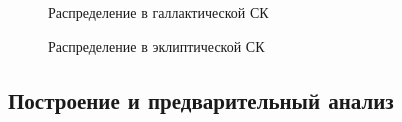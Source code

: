 \documentclass[14pt,aspectratio=43]{beamer}
\begin{document}
\begin{frame}[<alignment>]
\begin{figure}[h!]
\caption{Распределение в галлактической СК}
\label{img:hiptgasl}
\end{figure}
\end{frame}	

\begin{frame}[<alignment>]
\begin{figure}[h!]
\caption{Распределение в эклиптической СК}
\label{img:hiptgaslo}
\end{figure}
\end{frame}	



\subsection{Построение и предварительный анализ}\label{errvid}
\end{document}
